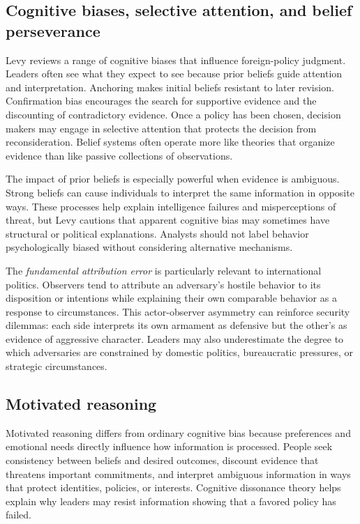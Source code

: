 \subsection{Cognitive biases, selective attention, and belief perseverance}

Levy reviews a range of cognitive biases that influence foreign-policy judgment. Leaders often see what they expect to see because prior beliefs guide attention and interpretation. Anchoring makes initial beliefs resistant to later revision. Confirmation bias encourages the search for supportive evidence and the discounting of contradictory evidence. Once a policy has been chosen, decision makers may engage in selective attention that protects the decision from reconsideration. Belief systems often operate more like theories that organize evidence than like passive collections of observations.

The impact of prior beliefs is especially powerful when evidence is ambiguous. Strong beliefs can cause individuals to interpret the same information in opposite ways. These processes help explain intelligence failures and misperceptions of threat, but Levy cautions that apparent cognitive bias may sometimes have structural or political explanations. Analysts should not label behavior psychologically biased without considering alternative mechanisms.

The \emph{fundamental attribution error} is particularly relevant to international politics. Observers tend to attribute an adversary's hostile behavior to its disposition or intentions while explaining their own comparable behavior as a response to circumstances. This actor-observer asymmetry can reinforce security dilemmas: each side interprets its own armament as defensive but the other's as evidence of aggressive character. Leaders may also underestimate the degree to which adversaries are constrained by domestic politics, bureaucratic pressures, or strategic circumstances.

\subsection{Motivated reasoning}

Motivated reasoning differs from ordinary cognitive bias because preferences and emotional needs directly influence how information is processed. People seek consistency between beliefs and desired outcomes, discount evidence that threatens important commitments, and interpret ambiguous information in ways that protect identities, policies, or interests. Cognitive dissonance theory helps explain why leaders may resist information showing that a favored policy has failed.

